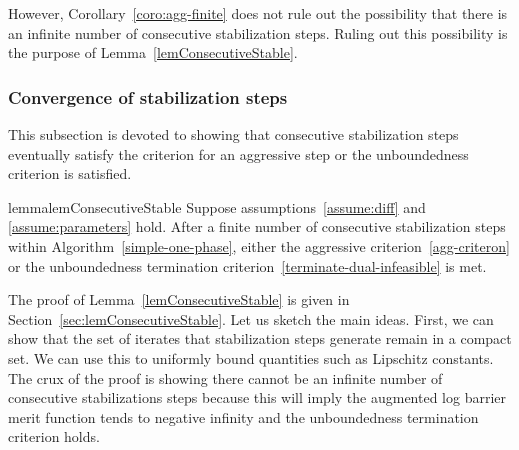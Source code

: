 \documentclass{article}
\begin{document}
However, Corollary~\ref{coro:agg-finite} does not rule out the possibility that there is an infinite number of consecutive stabilization steps. Ruling out this possibility is the purpose of Lemma~\ref{lemConsecutiveStable}.

\subsubsection{Convergence of stabilization steps}\label{conv:stb}

This subsection is devoted to showing that consecutive stabilization steps eventually satisfy the criterion for an aggressive step or the unboundedness criterion is satisfied. 



\begin{restatable}{lemma}{lemConsecutiveStable}\label{lemConsecutiveStable}
Suppose assumptions~\ref{assume:diff} and \ref{assume:parameters} hold. 
After a finite number of consecutive stabilization steps within Algorithm~\ref{simple-one-phase}, either the aggressive criterion~\eqref{agg-criteron} or the unboundedness termination criterion~\eqref{terminate-dual-infeasible} is met.
\end{restatable}

The proof of Lemma~\ref{lemConsecutiveStable} is given in Section~\ref{sec:lemConsecutiveStable}. Let us sketch the main ideas. First, we can show that the set of iterates that stabilization steps generate remain in a compact set. We can use this to uniformly bound quantities such as Lipschitz constants. The crux of the proof is showing there cannot be an infinite number of consecutive stabilizations steps because this will imply the augmented log barrier merit function tends to negative infinity and the unboundedness termination criterion holds.
\end{document}
